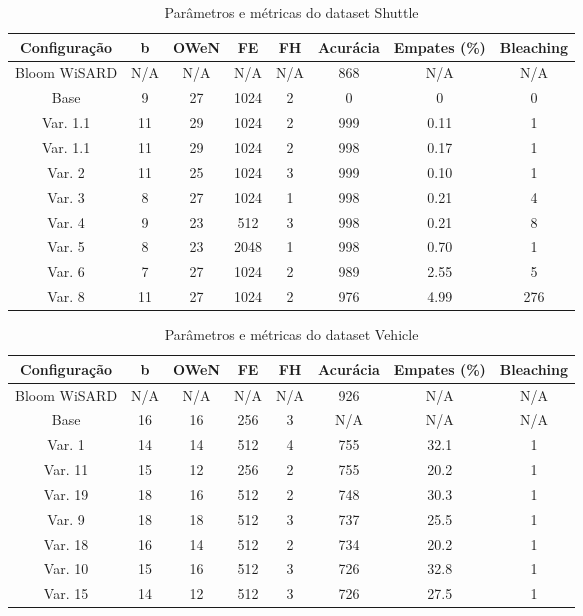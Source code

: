 \documentclass{article}
\begin{document}
{\begin{table}[H]
\caption{Parâmetros e métricas do dataset Shuttle}
\begin{tabular}{|c|c|c|c|c|c|c|c|}
\hline
\textbf{Configuração} & \textbf{b} & \textbf{OWeN} & \textbf{FE} & \textbf{FH} & \textbf{Acurácia} & \textbf{Empates (\%)} & \textbf{Bleaching} \\
\hline
Bloom WiSARD & N/A & N/A & N/A & N/A & 868 & N/A & N/A \\
\hline
Base & 9 & 27 & 1024 & 2 & 0 & 0 & 0 \\
\hline
Var. 1.1 & 11 & 29 & 1024 & 2 & 999 & 0.11 & 1 \\
\hline
Var. 1.1 & 11 & 29 & 1024 & 2 & 998 & 0.17 & 1 \\
\hline
Var. 2 & 11 & 25 & 1024 & 3 & 999 & 0.10 & 1 \\
\hline
Var. 3 & 8 & 27 & 1024 & 1 & 998 & 0.21 & 4 \\
\hline
Var. 4 & 9 & 23 & 512 & 3 & 998 & 0.21 & 8 \\
\hline
Var. 5 & 8 & 23 & 2048 & 1 & 998 & 0.70 & 1 \\
\hline
Var. 6 & 7 & 27 & 1024 & 2 & 989 & 2.55 & 5 \\
\hline
Var. 8 & 11 & 27 & 1024 & 2 & 976 & 4.99 & 276 \\
\hline
\end{tabular}
\end{table}

\begin{table}[H]
\caption{Parâmetros e métricas do dataset Vehicle}
\begin{tabular}{|c|c|c|c|c|c|c|c|}
\hline
\textbf{Configuração} & \textbf{b} & \textbf{OWeN} & \textbf{FE} & \textbf{FH} & \textbf{Acurácia} & \textbf{Empates (\%)} & \textbf{Bleaching} \\
\hline
Bloom WiSARD & N/A & N/A & N/A & N/A & 926 & N/A & N/A \\
\hline
Base & 16 & 16 & 256 & 3 & N/A & N/A & N/A \\
\hline
Var. 1 & 14 & 14 & 512 & 4 & 755 & 32.1 & 1 \\
\hline
Var. 11 & 15 & 12 & 256 & 2 & 755 & 20.2 & 1 \\
\hline
Var. 19 & 18 & 16 & 512 & 2 & 748 & 30.3 & 1 \\
\hline
Var. 9 & 18 & 18 & 512 & 3 & 737 & 25.5 & 1 \\
\hline
Var. 18 & 16 & 14 & 512 & 2 & 734 & 20.2 & 1 \\
\hline
Var. 10 & 15 & 16 & 512 & 3 & 726 & 32.8 & 1 \\
\hline
Var. 15 & 14 & 12 & 512 & 3 & 726 & 27.5 & 1 \\
\hline
\end{tabular}
\end{table}

}
\end{document}
